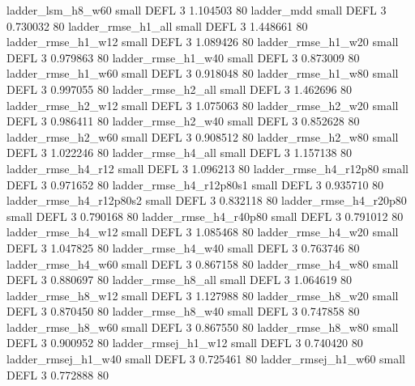        ladder_lsm_h8_w60      small     DEFL                 3 1.104503 80
              ladder_mdd      small     DEFL                 3 0.730032 80
      ladder_rmse_h1_all      small     DEFL                 3 1.448661 80
      ladder_rmse_h1_w12      small     DEFL                 3 1.089426 80
      ladder_rmse_h1_w20      small     DEFL                 3 0.979863 80
      ladder_rmse_h1_w40      small     DEFL                 3 0.873009 80
      ladder_rmse_h1_w60      small     DEFL                 3 0.918048 80
      ladder_rmse_h1_w80      small     DEFL                 3 0.997055 80
      ladder_rmse_h2_all      small     DEFL                 3 1.462696 80
      ladder_rmse_h2_w12      small     DEFL                 3 1.075063 80
      ladder_rmse_h2_w20      small     DEFL                 3 0.986411 80
      ladder_rmse_h2_w40      small     DEFL                 3 0.852628 80
      ladder_rmse_h2_w60      small     DEFL                 3 0.908512 80
      ladder_rmse_h2_w80      small     DEFL                 3 1.022246 80
      ladder_rmse_h4_all      small     DEFL                 3 1.157138 80
      ladder_rmse_h4_r12      small     DEFL                 3 1.096213 80
   ladder_rmse_h4_r12p80      small     DEFL                 3 0.971652 80
 ladder_rmse_h4_r12p80s1      small     DEFL                 3 0.935710 80
 ladder_rmse_h4_r12p80s2      small     DEFL                 3 0.832118 80
   ladder_rmse_h4_r20p80      small     DEFL                 3 0.790168 80
   ladder_rmse_h4_r40p80      small     DEFL                 3 0.791012 80
      ladder_rmse_h4_w12      small     DEFL                 3 1.085468 80
      ladder_rmse_h4_w20      small     DEFL                 3 1.047825 80
      ladder_rmse_h4_w40      small     DEFL                 3 0.763746 80
      ladder_rmse_h4_w60      small     DEFL                 3 0.867158 80
      ladder_rmse_h4_w80      small     DEFL                 3 0.880697 80
      ladder_rmse_h8_all      small     DEFL                 3 1.064619 80
      ladder_rmse_h8_w12      small     DEFL                 3 1.127988 80
      ladder_rmse_h8_w20      small     DEFL                 3 0.870450 80
      ladder_rmse_h8_w40      small     DEFL                 3 0.747858 80
      ladder_rmse_h8_w60      small     DEFL                 3 0.867550 80
      ladder_rmse_h8_w80      small     DEFL                 3 0.900952 80
     ladder_rmsej_h1_w12      small     DEFL                 3 0.740420 80
     ladder_rmsej_h1_w40      small     DEFL                 3 0.725461 80
     ladder_rmsej_h1_w60      small     DEFL                 3 0.772888 80
